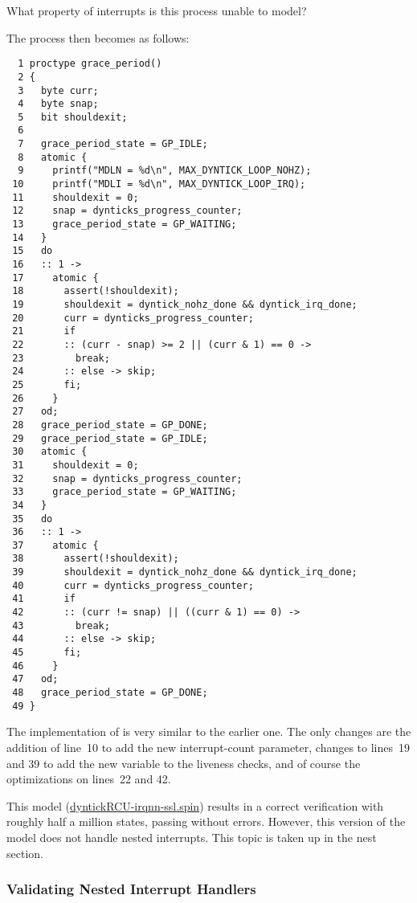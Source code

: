 \QuickQuiz{}
	What property of interrupts is this 
	process unable to model?
 \QuickQuizEnd

The  process then becomes as follows:

{ \scriptsize
\begin{verbatim}
  1 proctype grace_period()
  2 {
  3   byte curr;
  4   byte snap;
  5   bit shouldexit;
  6
  7   grace_period_state = GP_IDLE;
  8   atomic {
  9     printf("MDLN = %d\n", MAX_DYNTICK_LOOP_NOHZ);
 10     printf("MDLI = %d\n", MAX_DYNTICK_LOOP_IRQ);
 11     shouldexit = 0;
 12     snap = dynticks_progress_counter;
 13     grace_period_state = GP_WAITING;
 14   }
 15   do
 16   :: 1 ->
 17     atomic {
 18       assert(!shouldexit);
 19       shouldexit = dyntick_nohz_done && dyntick_irq_done;
 20       curr = dynticks_progress_counter;
 21       if
 22       :: (curr - snap) >= 2 || (curr & 1) == 0 ->
 23         break;
 24       :: else -> skip;
 25       fi;
 26     }
 27   od;
 28   grace_period_state = GP_DONE;
 29   grace_period_state = GP_IDLE;
 30   atomic {
 31     shouldexit = 0;
 32     snap = dynticks_progress_counter;
 33     grace_period_state = GP_WAITING;
 34   }
 35   do
 36   :: 1 ->
 37     atomic {
 38       assert(!shouldexit);
 39       shouldexit = dyntick_nohz_done && dyntick_irq_done;
 40       curr = dynticks_progress_counter;
 41       if
 42       :: (curr != snap) || ((curr & 1) == 0) ->
 43         break;
 44       :: else -> skip;
 45       fi;
 46     }
 47   od;
 48   grace_period_state = GP_DONE;
 49 }
\end{verbatim}
}

The implementation of  is very similar
to the earlier one.
The only changes are the addition of line~10 to add the new
interrupt-count parameter, changes to lines~19 and 39 to
add the new  variable to the liveness
checks, and of course the optimizations on lines~22 and 42.

This model (\url{dyntickRCU-irqnn-ssl.spin})
results in a correct verification with roughly half a million
states, passing without errors.
However, this version of the model does not handle nested
interrupts.
This topic is taken up in the nest section.

\subsubsection{Validating Nested Interrupt Handlers}
\label{app:formal:Validating Nested Interrupt Handlers}

